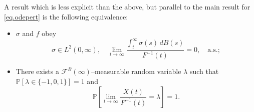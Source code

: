 \documentclass[a4paper,10pt,reqno]{amsart}
\numberwithin{equation}{section}
\theoremstyle{definition}
\theoremstyle{remark}
\DeclareMathOperator{\1}{\mathbbm 1}
\begin{document}
	A result which is less explicit than the above, but parallel to the main result for \eqref{eq.odepert} is the following equivalence:
	\begin{itemize}
		\item[(e)] $\sigma$ and $f$ obey 
		\[
		\sigma\in L^2(0,\infty), \quad \lim_{t\to\infty} \frac{\int_t^\infty \sigma(s)\,dB(s)}{F^{-1}(t)}=0, \quad\text{a.s.};
		\]
		\item[(f)] There exists a $\mathcal{F}^B(\infty)$--measurable random variable $\lambda$ such that $\mathbb{P}[\lambda\in \{-1,0,1\}]=1$ and 
		\[
		\mathbb{P}\left[\lim_{t\to\infty} \frac{X(t)}{F^{-1}(t)}=\lambda\right]=1.
		\]
	\end{itemize}
	
\end{document}
